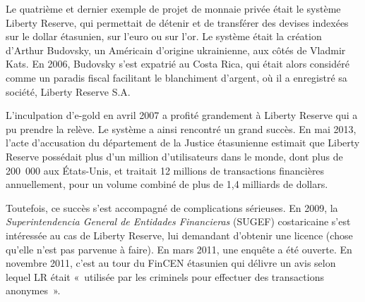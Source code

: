 
Le quatrième et dernier exemple de projet de monnaie privée était le système Liberty Reserve, qui permettait de détenir et de transférer des devises indexées sur le dollar étasunien, sur l'euro ou sur l'or. Le système était la création d'Arthur Budovsky, un Américain d'origine ukrainienne, aux côtés de Vladmir Kats. En 2006, Budovsky s'est expatrié au Costa Rica, qui était alors considéré comme un paradis fiscal facilitant le blanchiment d'argent, où il a enregistré sa société, Liberty Reserve S.A.  %

L'inculpation d'e-gold en avril 2007 a profité grandement à Liberty Reserve qui a pu prendre la relève. Le système a ainsi rencontré un grand succès. En mai 2013, l'acte d'accusation du département de la Justice étasunienne estimait que Liberty Reserve possédait plus d'un million d'utilisateurs dans le monde, dont plus de 200~000 aux États-Unis, et traitait 12 millions de transactions financières annuellement, pour un volume combiné de plus de 1,4 milliards de dollars.

Toutefois, ce succès s'est accompagné de complications sérieuses. En 2009, la \emph{Superintendencia General de Entidades Financieras} (SUGEF) costaricaine s'est intéressée au cas de Liberty Reserve, lui demandant d'obtenir une licence (chose qu'elle n'est pas parvenue à faire). En mars 2011, une enquête a été ouverte. En novembre 2011, c'est au tour du FinCEN étasunien qui délivre un avis selon lequel LR était «~utilisée par les criminels pour effectuer des transactions anonymes~».

